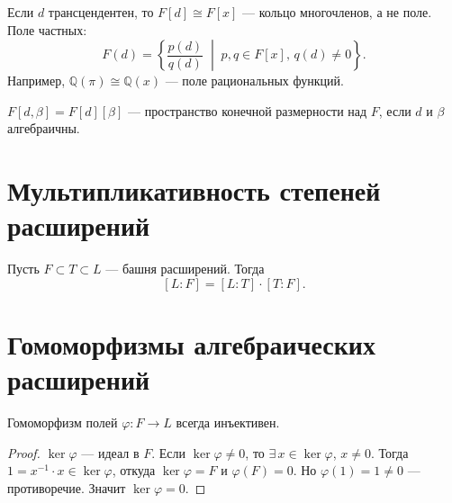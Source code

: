 \begin{remark}
    Если $d$ трансцендентен, то $F[d] \cong F[x]$ --- кольцо многочленов, а не поле. Поле частных:
    \[
        F(d) = \left\{\frac{p(d)}{q(d)} \;\middle|\; p, q \in F[x],\, q(d) \neq 0\right\}.
    \]
    Например, $\mathbb{Q}(\pi) \cong \mathbb{Q}(x)$ --- поле рациональных функций.
\end{remark}


\begin{stmt}
    $F[d, \beta] = F[d][\beta]$ --- пространство конечной размерности над $F$, если $d$ и $\beta$ алгебраичны.

\end{stmt}


\section{Мультипликативность степеней расширений}

\begin{stmt}
    Пусть $F \subset T \subset L$ --- башня расширений. Тогда
    \[
        [L : F] = [L : T] \cdot [T : F].
    \]
\end{stmt}


\section{Гомоморфизмы алгебраических расширений}

\begin{stmt}
    Гомоморфизм полей $\varphi\colon F \to L$ всегда инъективен.

    \begin{proof}
        $\ker\varphi$ --- идеал в $F$. Если $\ker\varphi \neq 0$, то $\exists\, x \in \ker\varphi$, $x \neq 0
        $.
        Тогда $1 = x^{-1} \cdot x \in \ker\varphi$, откуда $\ker\varphi = F$ и $\varphi(F) = 0$. Но $\varphi(1)
        = 1 \neq 0$ --- противоречие.
        Значит $\ker\varphi = 0$.
    \end{proof}
\end{stmt}


